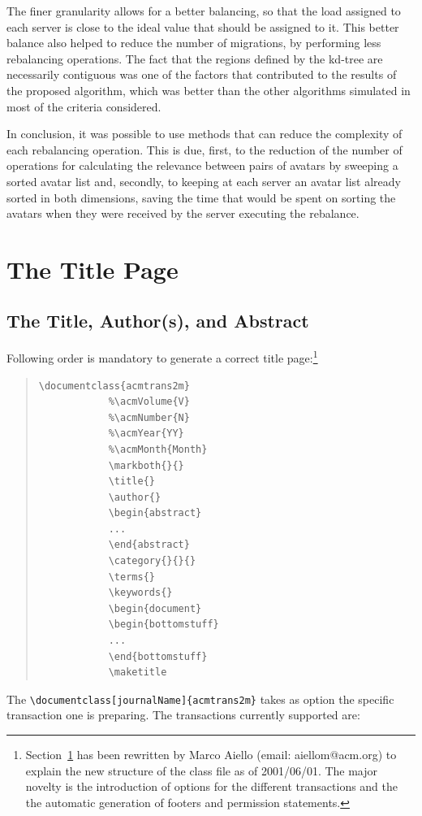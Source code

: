 \documentclass[acmtocl]{acmtrans2m}
\begin{document}
The finer granularity allows for a better balancing, so that the load assigned to each server is close to the ideal value that should be assigned to it. This better balance also helped to reduce the number of migrations, by performing less rebalancing operations. The fact that the regions defined by the kd-tree are necessarily contiguous was one of the factors that contributed to the results of the proposed algorithm, which was better than the other algorithms simulated in most of the criteria considered.

In conclusion, it was possible to use methods that can reduce the complexity of each rebalancing operation. This is due, first, to the reduction of the number of operations for calculating the relevance between pairs of avatars by sweeping a sorted avatar list and, secondly, to keeping at each server an avatar list already sorted in both dimensions, saving the time that would be spent on sorting the avatars when they were received by the server executing the rebalance.




\section{The Title Page}\label{sec:pag}

\subsection{The Title, Author(s), and Abstract}

Following order is mandatory to generate a correct title
page:\footnote{Section~\ref{sec:pag} has been rewritten by Marco
  Aiello (email: aiellom@acm.org) to explain the new structure of the
  class file as of 2001/06/01. The major novelty is the introduction
  of options for the different transactions and the the automatic
  generation of footers and permission statements.}

\begin{quote}
\begin{verbatim}
\documentclass{acmtrans2m}
            %\acmVolume{V}
            %\acmNumber{N}
            %\acmYear{YY}
            %\acmMonth{Month}
            \markboth{}{}
            \title{}
            \author{}
            \begin{abstract} 
            ...  
            \end{abstract}
            \category{}{}{}
            \terms{} 
            \keywords{}
            \begin{document}
            \begin{bottomstuff} 
            ... 
            \end{bottomstuff}
            \maketitle
\end{verbatim}
\end{quote}
The \verb|\documentclass[journalName]{acmtrans2m}| takes as option the
specific transaction one is preparing. The transactions currently
supported are:
\end{document}
